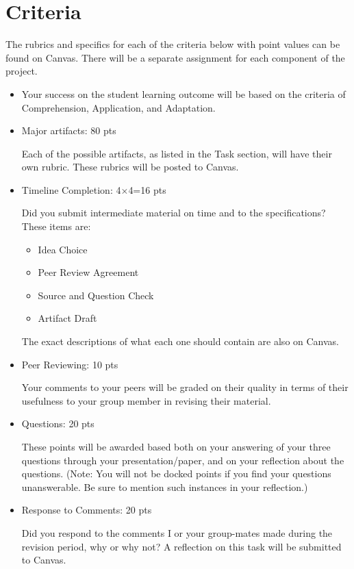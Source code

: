 \documentclass[12pt]{article}
\begin{document}
	\section*{Criteria}
	The rubrics and specifics for each of the criteria below with point values can be found on Canvas.  There will be a separate assignment for each component of the project.
	\begin{itemize}
		\item Your success on the student learning outcome will be based on the criteria of Comprehension, Application, and Adaptation.
		
		\item Major artifacts: 80 pts 
		
			Each of the possible artifacts, as listed in the Task section, will have their own rubric. These rubrics will be posted to Canvas.
			
		\item Timeline Completion: 4$\times$4=16 pts
		
			Did you submit intermediate material on time and to the specifications? These items are:
				\begin{itemize}
					\item Idea Choice
					\item Peer Review Agreement
					\item Source and Question Check
					\item Artifact Draft
				\end{itemize}
			The exact descriptions of what each one should contain are also on Canvas.
			
		\item Peer Reviewing: 10 pts
		
			Your comments to your peers will be graded on their quality in terms of their usefulness to your group member in revising their material.
			
		\item Questions: 20 pts
			
			These points will be awarded based both on your answering of your three questions through your presentation/paper, and on your reflection about the questions. (Note: You will not be docked points if you find your questions unanswerable.  Be sure to mention such instances in your reflection.)
		
		\item Response to Comments: 20 pts
		
			Did you respond to the comments I or your group-mates made during the revision period, why or why not? A reflection on this task will be submitted to Canvas.
	\end{itemize}
\end{document}
